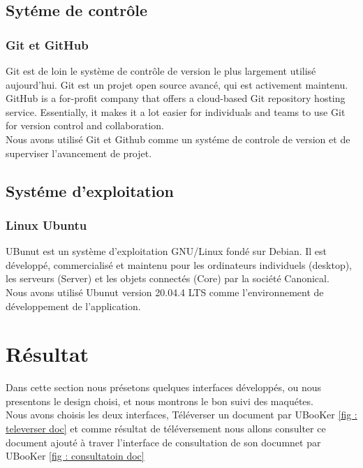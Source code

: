 \documentclass[12pt]{report}
\begin{document}
\subsection{Sytéme de contrôle}

\subsubsection{Git et GitHub}

Git est de loin le système de contrôle de version le plus largement utilisé aujourd'hui. Git est un projet open source avancé, qui est activement maintenu\cite{30}.\\
GitHub is a for-profit company that offers a cloud-based Git repository hosting service. Essentially, it makes it a lot easier for individuals and teams to use Git for version control and collaboration\cite{31}.\\
Nous avons utilisé Git et Github comme un systéme de controle de version et de superviser l'avancement de projet.

\subsection{Systéme d'exploitation}

\subsubsection{Linux Ubuntu}

UBunut est un système d’exploitation GNU/Linux fondé sur Debian. Il est développé, commercialisé et maintenu pour les ordinateurs individuels (desktop), les serveurs (Server) et les objets connectés (Core) par la société Canonical\cite{32}.\\
Nous avons utilisé Ubunut version 20.04.4 LTS comme l'environnement de développement de l'application.
\newpage
\section{Résultat}

Dans cette section nous présetons quelques interfaces développés, ou nous presentons le design choisi, et nous montrons le bon suivi des maquétes.\\
Nous avons choisis les deux interfaces, Téléverser un document par UBooKer \ref{fig : televerser doc} et comme résultat de téléversement nous allons consulter ce document ajouté à traver l'interface de consultation de son documnet par UBooKer \ref{fig : consultatoin doc}
\end{document}
